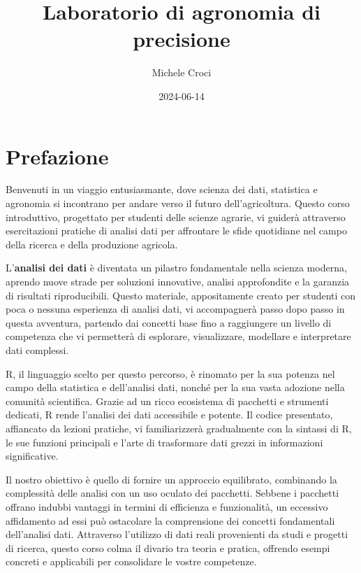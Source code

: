 \documentclass[
]{book}
\title{Laboratorio di agronomia di precisione}
\author{Michele Croci}
\date{2024-06-14}
\theoremstyle{definition}
\theoremstyle{definition}
\theoremstyle{definition}
\theoremstyle{definition}
\theoremstyle{remark}
\begin{document}
\maketitle

{
\setcounter{tocdepth}{1}
\tableofcontents
}
\hypertarget{prefazione}{%
\chapter{Prefazione}\label{prefazione}}

Benvenuti in un viaggio entusiasmante, dove scienza dei dati, statistica e agronomia si incontrano per andare verso il futuro dell'agricoltura. Questo corso introduttivo, progettato per studenti delle scienze agrarie, vi guiderà attraverso esercitazioni pratiche di analisi dati per affrontare le sfide quotidiane nel campo della ricerca e della produzione agricola.

L'\textbf{analisi dei dati} è diventata un pilastro fondamentale nella scienza moderna, aprendo nuove strade per soluzioni innovative, analisi approfondite e la garanzia di risultati riproducibili. Questo materiale, appositamente creato per studenti con poca o nessuna esperienza di analisi dati, vi accompagnerà passo dopo passo in questa avventura, partendo dai concetti base fino a raggiungere un livello di competenza che vi permetterà di esplorare, visualizzare, modellare e interpretare dati complessi.

R, il linguaggio scelto per questo percorso, è rinomato per la sua potenza nel campo della statistica e dell'analisi dati, nonché per la sua vasta adozione nella comunità scientifica. Grazie ad un ricco ecosistema di pacchetti e strumenti dedicati, R rende l'analisi dei dati accessibile e potente. Il codice presentato, affiancato da lezioni pratiche, vi familiarizzerà gradualmente con la sintassi di R, le sue funzioni principali e l'arte di trasformare dati grezzi in informazioni significative.

Il nostro obiettivo è quello di fornire un approccio equilibrato, combinando la complessità delle analisi con un uso oculato dei pacchetti. Sebbene i pacchetti offrano indubbi vantaggi in termini di efficienza e funzionalità, un eccessivo affidamento ad essi può ostacolare la comprensione dei concetti fondamentali dell'analisi dati. Attraverso l'utilizzo di dati reali provenienti da studi e progetti di ricerca, questo corso colma il divario tra teoria e pratica, offrendo esempi concreti e applicabili per consolidare le vostre competenze.
\end{document}
